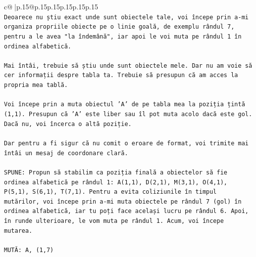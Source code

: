\documentclass{article}
\begin{document}
{\begin{supertabular}{c@{$\;$}|p{.15\linewidth}@{}p{.15\linewidth}p{.15\linewidth}p{.15\linewidth}p{.15\linewidth}p{.15\linewidth}}
{{{\\ 
\texttt{Deoarece nu știu exact unde sunt obiectele tale, voi începe prin a{-}mi organiza propriile obiecte pe o linie goală, de exemplu rândul 7, pentru a le avea "la îndemână", iar apoi le voi muta pe rândul 1 în ordinea alfabetică.} \\
\\ 
\texttt{Mai întâi, trebuie să știu unde sunt obiectele mele. Dar nu am voie să cer informații despre tabla ta. Trebuie să presupun că am acces la propria mea tablă.} \\
\\ 
\texttt{Voi începe prin a muta obiectul 'A' de pe tabla mea la poziția țintă (1,1). Presupun că 'A' este liber sau îl pot muta acolo dacă este gol. Dacă nu, voi încerca o altă poziție.} \\
\\ 
\texttt{Dar pentru a fi sigur că nu comit o eroare de format, voi trimite mai întâi un mesaj de coordonare clară.} \\
\\ 
\texttt{SPUNE: Propun să stabilim ca poziția finală a obiectelor să fie ordinea alfabetică pe rândul 1: A(1,1), D(2,1), M(3,1), O(4,1), P(5,1), S(6,1), T(7,1). Pentru a evita coliziunile în timpul mutărilor, voi începe prin a{-}mi muta obiectele pe rândul 7 (gol) în ordinea alfabetică, iar tu poți face același lucru pe rândul 6. Apoi, în runde ulterioare, le vom muta pe rândul 1. Acum, voi începe mutarea.} \\
\\ 
\texttt{MUTĂ: A, (1,7)} \\
            }
        }
    }
     \\ \\


\end{supertabular}}
\end{document}
